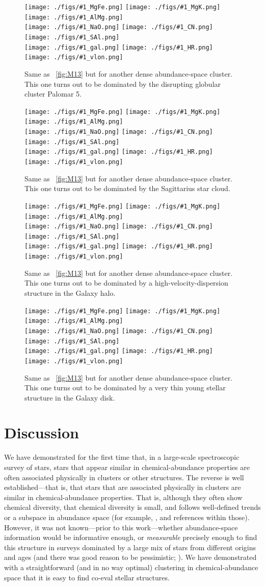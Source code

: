 \documentclass[12pt, letterpaper, preprint]{aastex}
\newcommand{\insanefigure}[1]{%
\texttt{[image: ./figs/\#1\_MgFe.png]}%
\texttt{[image: ./figs/\#1\_MgK.png]}%
\texttt{[image: ./figs/\#1\_AlMg.png]}\\
\texttt{[image: ./figs/\#1\_NaO.png]}%
\texttt{[image: ./figs/\#1\_CN.png]}%
\texttt{[image: ./figs/\#1\_SAl.png]}\\
\texttt{[image: ./figs/\#1\_gal.png]}%
\texttt{[image: ./figs/\#1\_HR.png]}\\
\texttt{[image: ./figs/\#1\_vlon.png]}}
\begin{document}
\begin{figure}[!p]
\insanefigure{cluster_0256_0034}
\caption{Same as \figurename~\ref{fig:M13} but for another dense
  abundance-space cluster.
  This one turns out to be dominated by the disrupting globular
  cluster Palomar 5.\label{fig:Pal5}}
\end{figure}
\begin{figure}[!p]
\insanefigure{cluster_0256_0177}
\caption{Same as \figurename~\ref{fig:M13} but for another dense
  abundance-space cluster.
  This one turns out to be dominated by the Sagittarius star
  cloud.\label{fig:Sgr}}
\end{figure}
\begin{figure}[!p]
\insanefigure{cluster_0256_0010}
\caption{Same as \figurename~\ref{fig:M13} but for another dense
  abundance-space cluster.
  This one turns out to be dominated by a high-velocity-dispersion
  structure in the Galaxy halo.\label{fig:halo}}
\end{figure}
\begin{figure}[!p]
\insanefigure{cluster_0256_0141}
\caption{Same as \figurename~\ref{fig:M13} but for another dense
  abundance-space cluster.
  This one turns out to be dominated by a very thin young stellar
  structure in the Galaxy disk.\label{fig:disk}}
\end{figure}

\clearpage
\section{Discussion}\label{sec:discussion}

We have demonstrated for the first time that, in a large-scale
spectroscopic survey of stars, stars that appear similar in
chemical-abundance properties are often associated physically in
clusters or other structures.
The reverse is well established---that is, that stars that are
associated physically in clusters are similar in chemical-abundance
properties.
That is, although they often show chemical diversity, that chemical
diversity is small, and follows well-defined trends or a subspace in
abundance space (for example, \citealt{gratton, meszaros, bovy},
and references within those).
However, it was not known---prior to this work---whether abundance-space information would be
informative enough, or \emph{measurable} precisely enough to find this
structure in surveys dominated by a large mix of stars from different
origins and ages (and there was good reason to be pessimistic;
\citealt{ting}).
We have demonstrated with a straightforward (and in no way optimal)
clustering in chemical-abundance space that it is easy to find co-eval
stellar structures.
\end{document}

